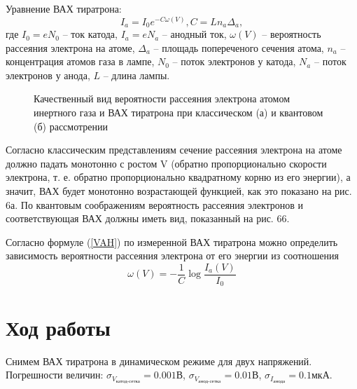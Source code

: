 \documentclass[14pt,a4paper]{scrartcl}
\begin{document}
Уравнение ВАХ тиратрона:
\begin{equation} \label{VAH}
I_a = I_0 e^{-C\omega(V)}, C = L n_a \Delta_a,
\end{equation}
где $I_0 = e N_0$ -- ток катода, $I_a = e N_a$ -- анодный ток, $\omega(V)$ -- вероятность рассеяния электрона на атоме, $\Delta_a$ -- площадь попереченого сечения атома, $n_a$ -- концентрация атомов газа в лампе, $N_0$ -- поток электронов у катода, $N_a$ -- поток электронов у анода, $L$ -- длина лампы.


\begin{figure}[ht!]\label{omega} 
\caption{Качественный вид вероятности рассеяния электрона атомом инертного газа и ВАХ тиратрона при классическом (а) и квантовом (б) рассмотрении}
\end{figure}

Согласно классическим представлениям сечение рассеяния электрона на атоме должно падать монотонно с ростом V (обратно пропорционально скорости электрона, т. е. обратно пропорционально квадратному корню из его энергии), а значит, ВАХ будет монотонно возрастающей функцией, как это показано на рис. 6а. По квантовым соображениям вероятность рассеяния электронов и соответствующая ВАХ должны иметь вид, показанный на рис. 66.

Согласно формуле (\ref{VAH}) по измеренной ВАХ тиратрона можно определить зависимость вероятности рассеяния электрона от его энергии из соотношения
\begin{equation}
\omega(V) = -\frac{1}{C} \log\frac{I_a(V)}{I_0}
\end{equation}



\section{Ход работы}


Снимем ВАХ тиратрона в динамическом режиме для двух напряжений. Погрешности величин:  $\sigma_{V_{\text{катод-сетка}}} = 0.001$В, $\sigma_{V_{\text{анод-сетка}}} = 0.01$В, $\sigma_{I_{\text{анода}}} = 0.1$мкА.
\end{document}
